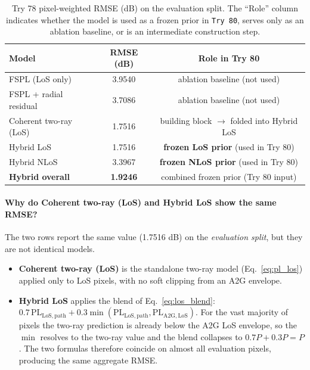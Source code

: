 \documentclass[11pt,a4paper]{article}
\begin{document}
\begin{table}[H]
\centering
\caption{Try 78 pixel-weighted RMSE (dB) on the evaluation split. The
``Role'' column indicates whether the model is used as a frozen prior in
\texttt{Try 80}, serves only as an ablation baseline, or is an intermediate
construction step.}
\label{tab:try78_rmse}
\begin{tabular}{lcc}
\toprule
Model & RMSE (dB) & Role in Try 80\\
\midrule
FSPL (LoS only)            & 3.9540 & ablation baseline (not used)\\
FSPL + radial residual     & 3.7086 & ablation baseline (not used)\\
Coherent two-ray (LoS)     & 1.7516 & building block $\to$ folded into Hybrid LoS\\
Hybrid LoS                 & 1.7516 & \textbf{frozen LoS prior} (used in Try 80)\\
Hybrid NLoS                & 3.3967 & \textbf{frozen NLoS prior} (used in Try 80)\\
\midrule
\textbf{Hybrid overall}    & \textbf{1.9246} & combined frozen prior (Try 80 input)\\
\bottomrule
\end{tabular}
\end{table}

\paragraph{Why do Coherent two-ray (LoS) and Hybrid LoS show the same RMSE?}
The two rows report the same value (1.7516 dB) on the \emph{evaluation split},
but they are not identical models.

\begin{itemize}
\item \textbf{Coherent two-ray (LoS)} is the standalone two-ray model
      (Eq.~\ref{eq:pl_los}) applied only to LoS pixels, with no soft clipping
      from an A2G envelope.
\item \textbf{Hybrid LoS} applies the blend of Eq.~\ref{eq:los_blend}:
      $0.7\,\mathrm{PL}_{\mathrm{LoS,path}} + 0.3\min(\mathrm{PL}_{\mathrm{LoS,path}},
      \mathrm{PL}_{\mathrm{A2G,LoS}})$.
      For the vast majority of pixels the two-ray prediction is already below
      the A2G LoS envelope, so the $\min$ resolves to the two-ray value and
      the blend collapses to $0.7P + 0.3P = P$. The two formulas therefore
      coincide on almost all evaluation pixels, producing the same aggregate RMSE.
\end{itemize}
\end{document}
